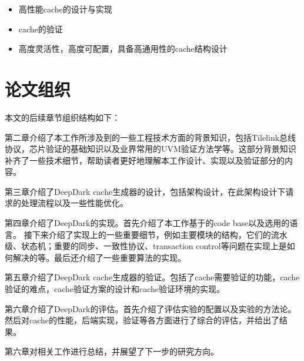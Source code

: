 \begin{itemize}
	\item 高性能cache的设计与实现
	\item cache的验证
	\item 高度灵活性，高度可配置，具备高通用性的cache结构设计
\end{itemize}

\section{论文组织}

本文的后续章节组织结构如下：

第二章介绍了本工作所涉及到的一些工程技术方面的背景知识，包括Tilelink总线协议，芯片验证的基础知识以及业界常用的UVM验证方法学等。这部分背景知识补齐了一些技术细节，帮助读者更好地理解本工作设计、实现以及验证部分的内容。

第三章介绍了DeepDark cache生成器的设计，包括架构设计，在此架构设计下请求的处理流程以及一些性能优化。

第四章介绍了DeepDark的实现。首先介绍了本工作基于的code base以及选用的语言。 接下来介绍了实现上的一些重要细节，例如主要模块的结构，它们的流水级、状态机；重要的同步、一致性协议、transaction control等问题在实现上是如何解决的等。最后还介绍了一些重要算法的实现。

第五章介绍了DeepDark cache生成器的验证。包括了cache需要验证的功能，cache验证的难点，cache验证方案的设计和cache验证环境的实现。

第六章介绍了DeepDark的评估。首先介绍了评估实验的配置以及实验的方法论。然后对cache的性能，后端实现，验证等各方面进行了综合的评估，并给出了结果。

第六章对相关工作进行总结，并展望了下一步的研究方向。
